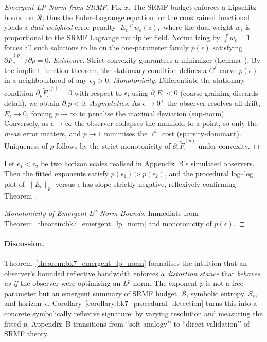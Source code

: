 \begin{proof}[Emergent LP Norm from SRMF]
\label{proof:bk7_emergent_lp_norm_from_srmf}
Fix $\tilde{x}$.  The SRMF budget enforces a Lipschitz bound on
$\mathcal{R}$; thus the Euler–Lagrange equation for the constrained
functional yields a \emph{dual‐weighted} error penalty
\(
|E_{\epsilon}|^{p}\,w_{\epsilon}(z),
\)
where the dual weight $w_{\epsilon}$ is proportional to the SRMF
Lagrange multiplier field.  Normalizing by
$\int w_{\epsilon}\!=\!1$ forces all such solutions to lie on the
one‑parameter family $p(\epsilon)$ satisfying
\(
\partial\tilde{F}_{s}^{(p)}/\partial p = 0.
\)
\emph{Existence.}  
Strict convexity guarantees a minimizer
(Lemma~).  
By the implicit function theorem, the stationary
condition defines a $C^{1}$ curve $p(\epsilon)$ in a neighbourhood of
any $\epsilon_{0}>0$.
\emph{Monotonicity.}  
Differentiate the stationary condition
\(
\partial_{p}\tilde{F}_{s}^{(p)}=0
\)
with respect to $\epsilon$; using
$\partial_{\epsilon}E_{\epsilon}<0$ (coarse‑graining discards detail),
we obtain
\(
\partial_{\epsilon}p < 0.
\)
\emph{Asymptotics.}  
As $\epsilon\!\to\! 0^{+}$ the observer resolves all drift,
$E_{\epsilon}\!\to\!0$, forcing $p\!\to\!\infty$ to penalise the
maximal deviation (sup‑norm).  
Conversely, as $\epsilon\!\to\!\infty$ the
observer collapses the manifold to a point,
so only the \emph{mean} error matters, and
$p\!\to\!1$ minimises the $\ell^{1}$ cost (sparsity‑dominant).
Uniqueness of $p$ follows by the strict monotonicity of
$\partial_{p}\tilde{F}_{s}^{(p)}$ under convexity.
\end{proof}
\begin{corollary}
\label{corollary:bk7_procedural_detection}
Let $\epsilon_{1}<\epsilon_{2}$ be two horizon scales realised in
Appendix~B’s simulated observers.  Then the fitted exponents satisfy
$p(\epsilon_{1})>p(\epsilon_{2})$, and the procedural
log–log plot of
\(
\lVert E_{\epsilon}\rVert_{p}
\)
versus $\epsilon$ has slope strictly negative, reflexively
confirming Theorem~.
\end{corollary}
\begin{proof}[Monotonicity of Emergent \( L^p \)-Norm Bounds]
\label{proof:bk7_lp_norm_monotonicity}
Immediate from Theorem~\ref{theorem:bk7_emergent_lp_norm}
and monotonicity of $p(\epsilon)$.
\end{proof}
\paragraph{Discussion.}
Theorem~\ref{theorem:bk7_emergent_lp_norm} formalises the intuition that an
observer’s bounded reflective bandwidth enforces a \emph{distortion
stance} that \emph{behaves as if} the observer were optimising an
$L^{p}$ norm.  The exponent \(p\) is not a free parameter but an
emergent summary of SRMF budget~\(\mathcal{B}\), symbolic entropy~\(S_{s}\),
and horizon~\(\epsilon\).
Corollary~\ref{corollary:bk7_procedural_detection} turns this into a concrete
symbolically reflexive signature: by varying resolution and measuring the fitted
$p$, Appendix~B transitions from “soft analogy’’ to
“direct validation’’ of SRMF theory.

